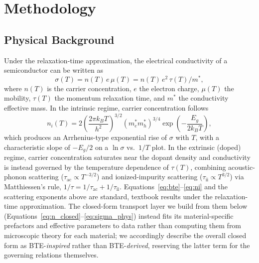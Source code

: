 \documentclass[11pt]{article}
\begin{document}
\section{Methodology}

\subsection{Physical Background}

Under the relaxation-time approximation, the electrical conductivity of a semiconductor can be written as
\begin{equation}
\sigma(T) = n(T)\, e\, \mu(T) = n(T)\, e^{2}\, \tau(T) / m^{*},
\label{eq:bte}
\end{equation}
where $n(T)$ is the carrier concentration, $e$ the electron charge, $\mu(T)$ the mobility, $\tau(T)$ the momentum relaxation time, and $m^{*}$ the conductivity effective mass. In the intrinsic regime, carrier concentration follows
\begin{equation}
n_i(T) = 2\left(\frac{2\pi k_B T}{h^2}\right)^{3/2} \left(m_e^{*} m_h^{*}\right)^{3/4} \exp\!\left(-\frac{E_g}{2 k_B T}\right),
\label{eq:ni}
\end{equation}
which produces an Arrhenius-type exponential rise of $\sigma$ with $T$, with a characteristic slope of $-E_g/2$ on a $\ln\sigma$ vs.\ $1/T$ plot. In the extrinsic (doped) regime, carrier concentration saturates near the dopant density and conductivity is instead governed by the temperature dependence of $\tau(T)$, combining acoustic-phonon scattering ($\tau_{\text{ac}} \propto T^{-3/2}$) \citep{bardeen1950deformation} and ionized-impurity scattering ($\tau_{\text{ii}} \propto T^{3/2}$) via Matthiessen's rule, $1/\tau = 1/\tau_{\text{ac}} + 1/\tau_{\text{ii}}$. Equations~\ref{eq:bte}--\ref{eq:ni} and the scattering exponents above are standard, textbook results under the relaxation-time approximation. The closed-form transport layer we build from them below (Equations~\ref{eq:n_closed}--\ref{eq:sigma_phys}) instead fits its material-specific prefactors and effective parameters to data rather than computing them from microscopic theory for each material; we accordingly describe the overall closed form as BTE-\emph{inspired} rather than BTE-\emph{derived}, reserving the latter term for the governing relations themselves.
\end{document}
